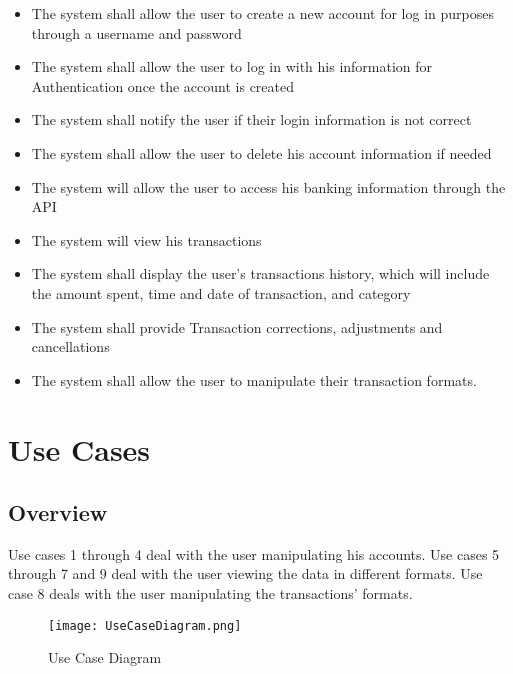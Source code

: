 \documentclass[11pt]{article}
\newcounter{use case ID}
\begin{document}
\begin{itemize}
   
    \item The system shall allow the user to create a new account for log in purposes through a username and password
    \item The system shall allow the user to log in with his information for Authentication once the account is created
    \item The system shall notify the user if their login information is not correct
    \item The system shall allow the user to delete his account information if needed
    \item The system will allow the user to access his banking information through the API
    \item The system will view his transactions 
    \item The system shall display the user's transactions history, which will include the amount spent, time and date of transaction, and category
    \item The system shall provide Transaction corrections, adjustments and cancellations
    \item The system shall allow the user to manipulate their transaction formats. 
\end{itemize}

\section{Use Cases}
\subsection{Overview}
Use cases 1 through 4 deal with the user manipulating his accounts. Use cases 5 through 7 and 9 deal with the user viewing the data in different formats. Use case 8 deals with the user manipulating the transactions' formats.

\begin{figure}[htbp]
\texttt{[image: UseCaseDiagram.png]}
\caption{Use Case Diagram}
\label{fig:use-case-diagram}
\end{figure}
\end{document}
